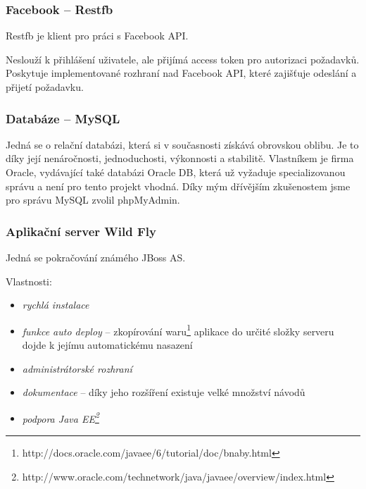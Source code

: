 \documentclass[thesis=B,czech]{FITthesis}[2012/06/26]
\begin{document}
\subsubsection{Facebook -- Restfb}
\label{design:technology_restfb}
Restfb je klient pro práci s Facebook API\cite{design_restapi_restfb}. 

Neslouží k přihlášení uživatele, ale přijímá access token pro autorizaci požadavků. Poskytuje implementované rozhraní nad Facebook API, které zajišťuje odeslání a přijetí požadavku.

\subsubsection {Databáze -- MySQL}
Jedná se o relační databázi, která si v současnosti získává obrovskou oblibu. Je to díky její nenáročnosti, jednoduchosti, výkonnosti a stabilitě. Vlastníkem je firma Oracle, vydávající také databázi Oracle DB, která už vyžaduje specializovanou správu a není pro tento projekt vhodná\cite{technology_mysql_vs_oracle}. Díky mým dřívějším zkušenostem jsme pro správu MySQL zvolil phpMyAdmin.

\subsubsection {Aplikační server Wild Fly}


Jedná se pokračování známého JBoss AS\cite{wildfly}.\newline

Vlastnosti:
\begin{itemize}[nosep]
	\item \textit{rychlá instalace}
	\item \textit{funkce auto deploy} -- zkopírování waru\footnote{http://docs.oracle.com/javaee/6/tutorial/doc/bnaby.html} aplikace do určité složky serveru dojde k jejímu automatickému nasazení
	\item \textit{administrátorské rozhraní}
	\item \textit{dokumentace} -- díky jeho rozšíření existuje velké množství návodů  
	\item \textit{podpora Java EE\footnote{http://www.oracle.com/technetwork/java/javaee/overview/index.html}}
\end{itemize}
\end{document}
